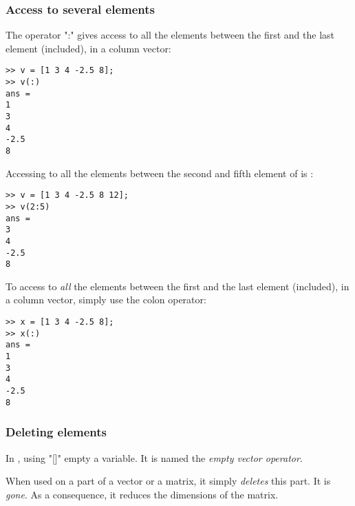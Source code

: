 \subsubsection{Access to several elements}

The operator ":" gives access to all the elements between the first and the last element (included), in a column vector:

\begin{lstlisting}
>> v = [1 3 4 -2.5 8];
>> v(:)
ans = 
1
3
4
-2.5
8
\end{lstlisting}

Accessing to all the elements between the second and fifth element of  is :

\begin{lstlisting}
>> v = [1 3 4 -2.5 8 12];
>> v(2:5)
ans = 
3
4
-2.5
8
\end{lstlisting}
To access to \emph{all} the elements between the first and the last element (included), in a column vector, simply use the colon operator:

\begin{lstlisting}
>> x = [1 3 4 -2.5 8];
>> x(:)
ans = 
1
3
4
-2.5
8
\end{lstlisting}




\subsubsection{Deleting elements}




In \matlab, using "[]" empty a variable. It is named the \emph{empty vector operator}.
	
When used on a part of a vector or a matrix, it simply \emph{deletes} this part.
It is \emph{gone}.
As a consequence, it reduces the dimensions of the matrix.


